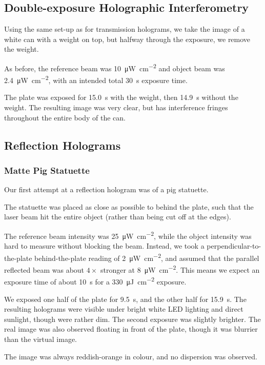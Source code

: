 \documentclass[a4paper]{scrartcl}
\begin{document}
\subsection{Double-exposure Holographic Interferometry}
Using the same set-up as for transmission holograms, we take the image of a white can with a weight on top, but halfway through the exposure, we remove the weight.

As before, the reference beam was \SI{10}{\micro\watt\per\centi\metre\squared} and object beam was \SI{2.4}{\micro\watt\per\centi\metre\squared}, with an intended total \SI{30}{\second} exposure time.

The plate was exposed for \SI{15.0}{\second} with the weight, then \SI{14.9}{\second} without the weight. The resulting image was very clear, but has interference fringes throughout the entire body of the can.

\subsection{Reflection Holograms}
\subsubsection{Matte Pig Statuette}
Our first attempt at a reflection hologram was of a pig statuette.

The statuette was placed as close as possible to behind the plate, such that the laser beam hit the entire object (rather than being cut off at the edges).

The reference beam intensity was \SI{25}{\micro\watt\per\centi\metre\squared}, while the object intensity was hard to measure without blocking the beam. Instead, we took a perpendicular-to-the-plate behind-the-plate reading of \SI{2}{\micro\watt\per\centi\metre\squared}, and assumed that the parallel reflected beam was about \(4\times\) stronger at \SI{8}{\micro\watt\per\centi\metre\squared}. This means we expect an exposure time of about \SI{10}{\second} for a \SI{330}{\micro\joule\per\centi\metre\squared} exposure.

We exposed one half of the plate for \SI{9.5}{\second}, and the other half for \SI{15.9}{\second}. The resulting holograms were visible under bright white LED lighting and direct sunlight, though were rather dim. The second exposure was slightly brighter. The real image was also observed floating in front of the plate, though it was blurrier than the virtual image.

The image was always reddish-orange in colour, and no dispersion was observed.
\end{document}
